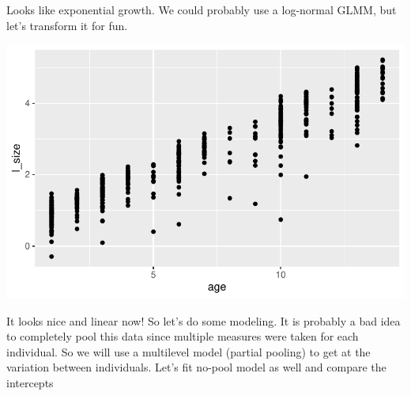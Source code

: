 \documentclass[
  letterpaper,
  DIV=11,
  numbers=noendperiod]{scrartcl}
\newenvironment{Shaded}{\begin{snugshade}}{\end{snugshade}}
\newcommand{\AttributeTok}[1]{\textcolor[rgb]{0.40,0.45,0.13}{#1}}
\newcommand{\FunctionTok}[1]{\textcolor[rgb]{0.28,0.35,0.67}{#1}}
\newcommand{\NormalTok}[1]{\textcolor[rgb]{0.00,0.23,0.31}{#1}}
\newcommand{\OtherTok}[1]{\textcolor[rgb]{0.00,0.23,0.31}{#1}}
\newcommand{\SpecialCharTok}[1]{\textcolor[rgb]{0.37,0.37,0.37}{#1}}
\begin{document}
Looks like exponential growth. We could probably use a log-normal GLMM,
but let's transform it for fun.

\begin{Shaded}
\end{Shaded}

\includegraphics{varying_intercepts_varying_slopes_files/figure-pdf/unnamed-chunk-9-1.pdf}

It looks nice and linear now! So let's do some modeling. It is probably
a bad idea to completely pool this data since multiple measures were
taken for each individual. So we will use a multilevel model (partial
pooling) to get at the variation between individuals. Let's fit no-pool
model as well and compare the intercepts
\end{document}

